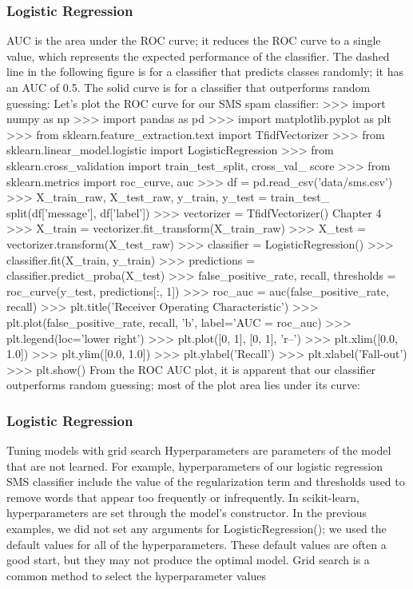 \begin{frame}
\begin{frame}
\begin{frame}
\begin{frame}
\begin{frame}
\begin{frame}
\begin{frame}
\begin{frame}
\begin{frame}\frametitle{Logistic Regression}
AUC is the area under the ROC curve; it reduces the ROC curve to a single value,
which represents the expected performance of the classifier. The dashed line in the
following figure is for a classifier that predicts classes randomly; it has an AUC of
0.5. The solid curve is for a classifier that outperforms random guessing:
Let's plot the ROC curve for our SMS spam classifier:
>>> import numpy as np
>>> import pandas as pd
>>> import matplotlib.pyplot as plt
>>> from sklearn.feature_extraction.text import TfidfVectorizer
>>> from sklearn.linear_model.logistic import LogisticRegression
>>> from sklearn.cross_validation import train_test_split, cross_val_
score
>>> from sklearn.metrics import roc_curve, auc
>>> df = pd.read_csv('data/sms.csv')
>>> X_train_raw, X_test_raw, y_train, y_test = train_test_
split(df['message'], df['label'])
>>> vectorizer = TfidfVectorizer()
Chapter 4
>>> X_train = vectorizer.fit_transform(X_train_raw)
>>> X_test = vectorizer.transform(X_test_raw)
>>> classifier = LogisticRegression()
>>> classifier.fit(X_train, y_train)
>>> predictions = classifier.predict_proba(X_test)
>>> false_positive_rate, recall, thresholds = roc_curve(y_test,
predictions[:, 1])
>>> roc_auc = auc(false_positive_rate, recall)
>>> plt.title('Receiver Operating Characteristic')
>>> plt.plot(false_positive_rate, recall, 'b', label='AUC = %
roc_auc)
>>> plt.legend(loc='lower right')
>>> plt.plot([0, 1], [0, 1], 'r--')
>>> plt.xlim([0.0, 1.0])
>>> plt.ylim([0.0, 1.0])
>>> plt.ylabel('Recall')
>>> plt.xlabel('Fall-out')
>>> plt.show()
From the ROC AUC plot, it is apparent that our classifier outperforms random
guessing; most of the plot area lies under its curve:
\begin{frame}\frametitle{Logistic Regression}
Tuning models with grid search
Hyperparameters are parameters of the model that are not learned. For example,
hyperparameters of our logistic regression SMS classifier include the value of
the regularization term and thresholds used to remove words that appear too
frequently or infrequently. In scikit-learn, hyperparameters are set through the
model's constructor. In the previous examples, we did not set any arguments for
LogisticRegression(); we used the default values for all of the hyperparameters.
These default values are often a good start, but they may not produce the optimal
model. Grid search is a common method to select the hyperparameter values

\end{frame}
\end{frame}
\end{frame}
\end{frame}
\end{frame}
\end{frame}
\end{frame}
\end{frame}
\end{frame}
\end{frame}
